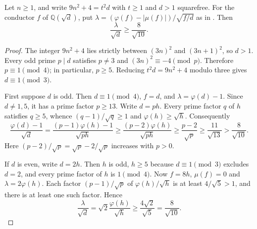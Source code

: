 \begin{lemma}\label{lem:uniform-quadratic-discriminant}
Let $n\geq1$, and write $9n^2+4=t^2d$ with $t\geq1$ and $d>1$ squarefree.
For the conductor $f$ of $\mathbb Q(\sqrt d)$, put
$\lambda=(\varphi(f)-|\mu(f)|)/\sqrt{f/d}$ as in
\cite[Lemma~\ref{B-lem:odd-quadratic-length}]{Finite}. Then
\[
 \frac{\lambda}{\sqrt d}\geq\frac8{\sqrt{10}}.
\]
\end{lemma}
\begin{proof}
The integer $9n^2+4$ lies strictly between $(3n)^2$ and $(3n+1)^2$,
so $d>1$. Every odd prime $p\mid d$ satisfies $p\ne3$ and
$(3n)^2\equiv-4\pmod p$. Therefore $p\equiv1\pmod4$; in particular,
$p\geq5$. Reducing $t^2d=9n^2+4$ modulo three gives $d\equiv1\pmod3$.

First suppose $d$ is odd. Then $d\equiv1\pmod4$, $f=d$, and
$\lambda=\varphi(d)-1$. Since $d\ne1,5$, it has a prime factor $p\geq13$.
Write $d=ph$. Every prime factor $q$ of $h$ satisfies $q\geq5$, whence
$(q-1)/\sqrt q\geq1$ and $\varphi(h)\geq\sqrt h$. Consequently
\[
 \frac{\varphi(d)-1}{\sqrt d}
 =\frac{(p-1)\varphi(h)-1}{\sqrt{ph}}
 \geq\frac{(p-2)\varphi(h)}{\sqrt{ph}}
 \geq\frac{p-2}{\sqrt p}
 \geq\frac{11}{\sqrt{13}}>\frac8{\sqrt{10}}.
\]
Here $(p-2)/\sqrt p=\sqrt p-2/\sqrt p$ increases with $p>0$.

If $d$ is even, write $d=2h$. Then $h$ is odd, $h\geq5$ because
$d\equiv1\pmod3$ excludes $d=2$, and every prime factor of $h$ is
$1\pmod4$. Now $f=8h$, $\mu(f)=0$ and
$\lambda=2\varphi(h)$. Each factor $(p-1)/\sqrt p$ of
$\varphi(h)/\sqrt h$ is at least $4/\sqrt5>1$, and there is at least
one such factor. Hence
\[
 \frac{\lambda}{\sqrt d}
 =\sqrt2\frac{\varphi(h)}{\sqrt h}
 \geq\frac{4\sqrt2}{\sqrt5}=\frac8{\sqrt{10}}.
\]
\end{proof}

